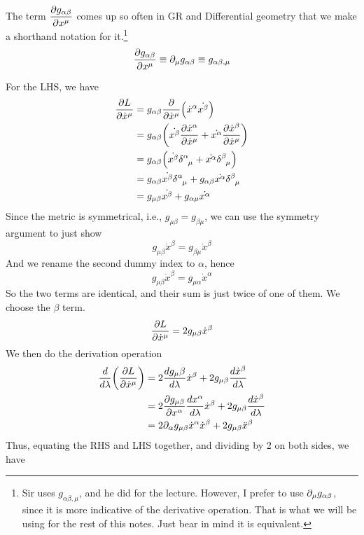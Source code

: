 	The term $\displaystyle \pdv{g_{\alpha\beta}}{x^\mu}$ comes up
	so often in GR and Differential geometry that we make a shorthand notation for it.\footnote{
		Sir uses $g_{\alpha\beta,\mu}$, and he did for the lecture.
		However, I prefer to use $\partial_\mu g_{\alpha\beta}$, since it is more
		indicative of the derivative operation. That is what we will be using 
		for the rest of this notes. Just bear in mind it is equivalent.
	}
	\[
		\pdv{g_{\alpha\beta}}{x^\mu} \equiv \partial_\mu g_{\alpha\beta} \equiv g_{\alpha\beta,\mu} 
	\]

	For the LHS, we have
	\begin{align*}
		\pdv{L}{\dot{x}^\mu}
		&= 
		g_{\alpha\beta} \pdv{}{\dot{x}^\mu}  
		\pqty{
				\dot{x}^\alpha \dot{x^\beta}
			}\\
		&= 
		g_{\alpha\beta} 
		\pqty{
			\dot{x^\beta}
			\pdv{
				\dot{x}^\alpha 
			}{
				\dot{x}^\mu
			} 
			+
			\dot{x^\alpha}
			\pdv{
				\dot{x}^\beta 
			}{
				\dot{x}^\mu
			} 
		}\\
		&= 
		g_{\alpha\beta} 
		\pqty{
			\dot{x^\beta}
			\delta\indices{^\alpha_\mu}
			+
			\dot{x^\alpha}
			\delta\indices{^\beta_\mu}
		}\\
		&= 
		g_{\alpha\beta} 
		\dot{x^\beta}
		\delta\indices{^\alpha_\mu}
		+
		g_{\alpha\beta} 
		\dot{x^\alpha}
		\delta\indices{^\beta_\mu}\\
		&= 
		g_{\mu\beta} 
		\dot{x^\beta}
		+
		g_{\alpha\mu} 
		\dot{x^\alpha}
	\end{align*}
	Since the metric is symmetrical, i.e., $g_{\mu\beta}= g_{\beta\mu}$, we can
	use the symmetry argument to just show
	\[
		g_{\mu\beta}\dot{x}^\beta = g_{\beta\mu}\dot{x}^\beta
	\]
	And we rename the second dummy index to $\alpha$, hence
	\[
		g_{\mu\beta}\dot{x}^\beta = g_{\mu\alpha}\dot{x}^\alpha
	\]
	So the two terms are identical, and their sum is just twice of one of them. We choose the $\beta$ term.
	\[
		\pdv{L}{\dot{x}^\mu}
		= 
		2g_{\mu\beta}\dot{x}^\beta
	\]
	We then do the derivation operation
	\begin{align*}
	    \dv{}{\lambda}
		\pqty{
			\pdv{L}{\dot{x}^\mu}
		}
		&= 
		2\dv{g_\mu\beta}{\lambda}\dot{x}^\beta + 2g_{\mu\beta}\dv{\dot{x}^\beta}{\lambda}\\
		&= 
		2\pdv{g_{\mu\beta}}{x^\alpha}\dv{x^\alpha}{\lambda}\dot{x}^\beta + 2g_{\mu\beta}\dv{\dot{x}^\beta}{\lambda}\\
		&= 
		2\p_\alpha{g_{\mu\beta}}\dot{x}^\alpha \dot{x}^\beta + 2g_{\mu\beta}\ddot{x}^\beta
	\end{align*}
	Thus, equating the RHS and LHS together, and dividing by 2 on both sides, we have
